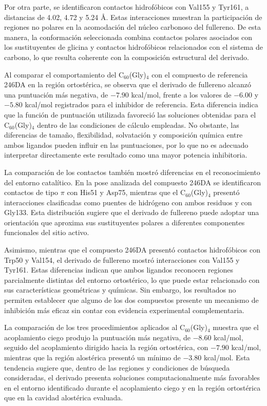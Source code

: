 Por otra parte, se identificaron contactos hidrofóbicos con Val155 y Tyr161, a distancias de 4.02, 4.72 y 5.24 \AA. Estas interacciones muestran la participación de regiones no polares en la acomodación del núcleo carbonoso del fullereno. De esta manera, la conformación seleccionada combina contactos polares asociados con los sustituyentes de glicina y contactos hidrofóbicos relacionados con el sistema de carbono, lo que resulta coherente con la composición estructural del derivado.

Al comparar el comportamiento del C$_{60}$(Gly)$_4$ con el compuesto de referencia 246DA en la región ortostérica, se observa que el derivado de fullereno alcanzó una puntuación más negativa, de $-7.90$ kcal/mol, frente a los valores de $-6.00$ y $-5.80$ kcal/mol registrados para el inhibidor de referencia. Esta diferencia indica que la función de puntuación utilizada favoreció las soluciones obtenidas para el C$_{60}$(Gly)$_4$ dentro de las condiciones de cálculo empleadas. No obstante, las diferencias de tamaño, flexibilidad, solvatación y composición química entre ambos ligandos pueden influir en las puntuaciones, por lo que no es adecuado interpretar directamente este resultado como una mayor potencia inhibitoria.

La comparación de los contactos también mostró diferencias en el reconocimiento del entorno catalítico. En la pose analizada del compuesto 246DA se identificaron contactos de tipo $\pi$ con His51 y Asp75, mientras que el C$_{60}$(Gly)$_4$ presentó interacciones clasificadas como puentes de hidrógeno con ambos residuos y con Gly133. Esta distribución sugiere que el derivado de fullereno puede adoptar una orientación que aproxima sus sustituyentes polares a diferentes componentes funcionales del sitio activo.

Asimismo, mientras que el compuesto 246DA presentó contactos hidrofóbicos con Trp50 y Val154, el derivado de fullereno mostró interacciones con Val155 y Tyr161. Estas diferencias indican que ambos ligandos reconocen regiones parcialmente distintas del entorno ortostérico, lo que puede estar relacionado con sus características geométricas y químicas. Sin embargo, los resultados no permiten establecer que alguno de los dos compuestos presente un mecanismo de inhibición más eficaz sin contar con evidencia experimental complementaria.

La comparación de los tres procedimientos aplicados al C$_{60}$(Gly)$_4$ muestra que el acoplamiento ciego produjo la puntuación más negativa, de $-8.60$ kcal/mol, seguido del acoplamiento dirigido hacia la región ortostérica, con $-7.90$ kcal/mol, mientras que la región alostérica presentó un mínimo de $-3.80$ kcal/mol. Esta tendencia sugiere que, dentro de las regiones y condiciones de búsqueda consideradas, el derivado presenta soluciones computacionalmente más favorables en el entorno identificado durante el acoplamiento ciego y en la región ortostérica que en la cavidad alostérica evaluada.

